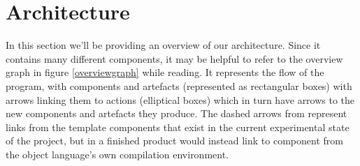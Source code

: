 \documentclass[nofilelist]{cslthse-msc}
\begin{document}
\section{Architecture}
In this section we'll be providing an overview of our architecture.
Since it contains many different components, it may be helpful to refer to the overview graph in figure \ref{overviewgraph} while reading.
It represents the flow of the program, with components and artefacts (represented as rectangular boxes) with arrows linking them to actions (elliptical boxes) which in turn have arrows to the new components and artefacts they produce.
The dashed arrows from represent links from the template components that exist in the current experimental state of the project, but in a finished product would instead link to component from the object language's own compilation environment.
\end{document}
